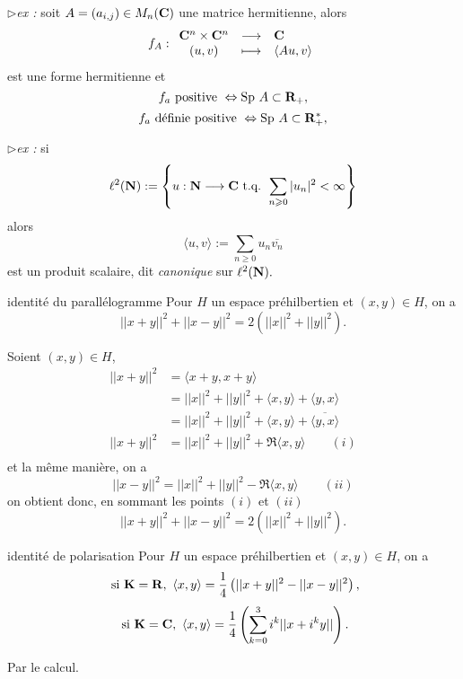 \documentclass[a4paper,11pt, twoside]{article}
\begin{document}
$\triangleright$\emph{ex :} soit $A=\left(a_{i,j}\right)\in M_n(\mathbf C)$ une matrice hermitienne, alors 
$$f_A:\begin{array}{ccl}
  \mathbf C^n\times\mathbf C^n&\longrightarrow&\mathbf C\\
  (u,v)&\longmapsto&\langle Au,v\rangle
\end{array}$$
est une forme hermitienne et 
$$f_a\text{ positive }\Leftrightarrow\mathrm{Sp}\ A\subset\R_+,$$
$$f_a\text{ définie positive }\Leftrightarrow\mathrm{Sp}\ A\subset\mathbf R_+^*,$$


$\triangleright$\emph{ex :} si 
$$\ell^2(\mathbf N):=\left\{u:\mathbf N\longrightarrow\mathbf C\text{ t.q. } \sum_{n\geqslant 0}|u_n|^2<\infty\right\}$$
alors 
$$\langle u,v\rangle:=\sum_{n\geqslant 0}u_n\overline{v_n}$$
est un produit scalaire, dit \emph{canonique} sur $\ell^2(\mathbf N).$


\begin{propC}{identité du parallélogramme}
  Pour $H$ un espace préhilbertien et $(x,y)\in H$, on a 
  $$||x+y||^2+||x-y||^2=2\left(||x||^2+||y||^2\right).$$
\end{propC}


\begin{Proof}
  Soient $(x,y)\in H$,
  \begin{align*}
    ||x+y||^2&=\langle x+y,x+y\rangle\\
    &=||x||^2+||y||^2+\langle x,y\rangle+\langle y,x\rangle\\
    &=||x||^2+||y||^2+\langle x,y\rangle+\overline{\langle y,x\rangle}\\
    ||x+y||^2&=||x||^2+||y||^2+\Re \langle x,y\rangle\qquad (i)\\
  \end{align*}
  et la même manière, on a 
  $$||x-y||^2=||x||^2+||y||^2-\Re \langle x,y\rangle\qquad (ii)$$
  on obtient donc, en sommant les points $(i)$ et $(ii)$
  $$||x+y||^2+||x-y||^2=2\left(||x||^2+||y||^2\right).$$
\end{Proof}


\begin{propC}{identité de polarisation}
  Pour $H$ un espace préhilbertien et $(x,y)\in H$, on a 
  $$\text{ si }\mathbf K=\mathbf R,\ \langle x,y\rangle=\frac14\left(||x+y||^2-||x-y||^2\right),$$
  $$\text{ si }\mathbf K=\mathbf C,\ \langle x,y\rangle=\frac14\left(\sum_{k=0}^3i^k||x+i^ky||\right).$$
\end{propC}


\begin{Proof}
  Par le calcul.
\end{Proof}
\end{document}
